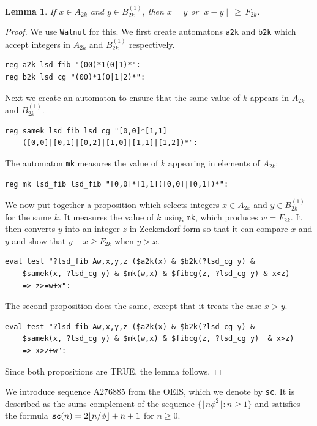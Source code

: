 \documentclass[12pt]{article}
\theoremstyle{plain}
\newtheorem{lemma}[theorem]{Lemma}
\theoremstyle{case}
\theoremstyle{definition}
\begin{document}
\begin{lemma}
\label{diff}
If $x \in A_{2k}$ and $y \in B_{2k}^{(1)}$, then $x = y$ or $\mid x - y \mid \, \geq \, F_{2k}$.
\end{lemma}
\begin{proof}
We use {\tt Walnut} for this. We first create automatons {\tt a2k} and {\tt b2k} which accept integers in $A_{2k}$ and $B_{2k}^{(1)}$ respectively.
\begin{verbatim}
reg a2k lsd_fib "(00)*1(0|1)*":
reg b2k lsd_cg "(00)*1(0|1|2)*":
\end{verbatim}

Next we create an automaton to ensure that the same value of $k$ appears in $A_{2k}$ and $B_{2k}^{(1)}$.
\begin{verbatim}
reg samek lsd_fib lsd_cg "[0,0]*[1,1]
    ([0,0]|[0,1]|[0,2]|[1,0]|[1,1]|[1,2])*":
\end{verbatim}

The automaton {\tt mk} measures the value of $k$ appearing in elements of $A_{2k}$:
\begin{verbatim}
reg mk lsd_fib lsd_fib "[0,0]*[1,1]([0,0]|[0,1])*":
\end{verbatim}

We now put together a proposition which selects integers $x \in A_{2k}$ and $y \in B_{2k}^{(1)}$ for the same $k$. It measures the value of $k$ using {\tt mk}, which produces $w = F_{2k}$. It then converts $y$ into an integer $z$ in Zeckendorf form so that it can compare $x$ and $y$ and show that $y-x \geq F_{2k}$ when $y > x$.
\begin{verbatim}
eval test "?lsd_fib Aw,x,y,z ($a2k(x) & $b2k(?lsd_cg y) & 
    $samek(x, ?lsd_cg y) & $mk(w,x) & $fibcg(z, ?lsd_cg y) & x<z) 
    => z>=w+x":
\end{verbatim}

The second proposition does the same, except that it treats the case $x > y$.
\begin{verbatim}
eval test "?lsd_fib Aw,x,y,z ($a2k(x) & $b2k(?lsd_cg y) & 
    $samek(x, ?lsd_cg y) & $mk(w,x) & $fibcg(z, ?lsd_cg y)  & x>z) 
    => x>z+w":
\end{verbatim}
Since both propositions are TRUE, the lemma follows.
\end{proof}

\bigskip


We introduce sequence A276885 from the OEIS\cite{oeis}, which we denote by {\tt sc}. It is described as the sums-complement of the sequence $\{ \lfloor n \phi^2 \rfloor : n \geq 1 \}$ and satisfies the formula ${\tt sc} (n) = 2 \lfloor n/\phi \rfloor + n + 1$ for $n \geq 0$.\cite{Dekking:2017aa}
\end{document}
